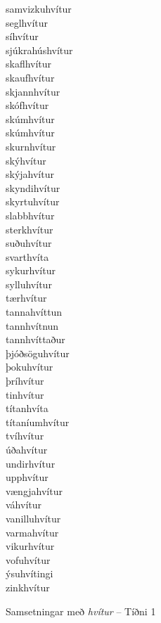 \documentclass[../samsetningasafn.tex]{subfiles}
\begin{document}
\begin{bigwordlist}
\begin{footnotesize}
\begin{multicols}{4}
\begin{description}
		\item [samvizkuhvítur]
		\item [seglhvítur]
		\item [síhvítur]
		\item [sjúkrahúshvítur]
		\item [skaflhvítur]
		\item [skaufhvítur]
		\item [skjannhvítur]
		\item [skófhvítur]
		\item [skúmhvítur]
		\item [skúmhvítur]
		\item [skurnhvítur]
		\item [skýhvítur]
		\item [skýjahvítur]
		\item [skyndihvítur]
		\item [skyrtuhvítur]
		\item [slabbhvítur]
		\item [sterkhvítur]
		\item [suðuhvítur]
		\item [svarthvíta]
		\item [sykurhvítur]
		\item [sylluhvítur]
		\item [tærhvítur]
		\item [tannahvíttun]
		\item [tannhvítnun]
		\item [tannhvíttaður]
		\item [þjóðsöguhvítur]
		\item [þokuhvítur]	
		\item [þríhvítur]
		\item [tinhvítur]
		\item [títanhvíta]
		\item [títaníumhvítur]
		\item [tvíhvítur]
		\item [úðahvítur]
		\item [undirhvítur]
		\item [upphvítur]
		\item [vængjahvítur]
		\item [váhvítur]
		\item [vanilluhvítur]
		\item [varmahvítur]
		\item [vikurhvítur]
		\item [vofuhvítur]
		\item [ýsuhvítingi]
		\item [zinkhvítur]
	\end{description}
\end{multicols}
\end{footnotesize}

\label{listi:svart1}
\caption{Samsetningar með \textit{hvítur} -- Tíðni 1}
\end{bigwordlist}
\end{document}
